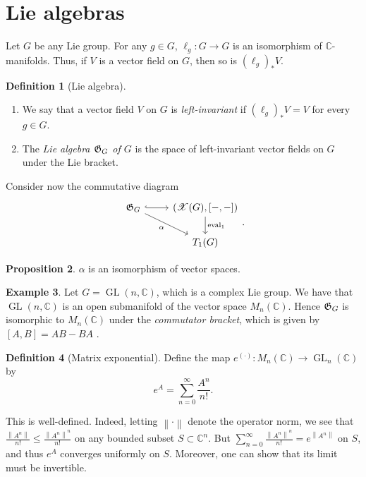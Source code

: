 \documentclass[10pt,letterpaper,cm]{nupset}
\theoremstyle{definition}
\newtheorem{defn}{Definition}[subsection]
\newtheorem{exmp}[defn]{Example}
\theoremstyle{theorem}
\newtheorem{prop}[defn]{Proposition}
\theoremstyle{remark}
\newcommand{\C}{\mathbb C}
\newcommand{\G}{\frak{G}}
\newcommand{\X}{\mathscr X}
\newcommand{\1}{\mathbb{1}}
\newcommand{\0}{\vec 0}
\DeclareMathOperator{\GL}{GL}
\DeclareMathOperator{\ev}{eval}
\newcommand{\be}{\begin{enumerate}}
\newcommand{\ee}{\end{enumerate}}
\begin{document}
\section{Lie algebras}

Let $G$ be any Lie group. For any $g\in G$, $\ell_g : G \to G$ is an isomorphism of $\C$-manifolds. Thus, if $V$ is a vector field on $G$, then so is $\left(\ell_g\right)_{\ast}{V}$.

\begin{defn}[Lie algebra] $ $
\be
\item We say that a vector field $V$ on $G$ is \textit{left-invariant} if $\left(\ell_g\right)_{\ast}{V} = V$ for every $g\in G$.
\item The \textit{Lie algebra $\G_G$ of $G$} is the space of left-invariant vector fields on $G$ under the Lie bracket.
\ee
\end{defn}

Consider now the commutative diagram
\[
\begin{tikzcd}
\G_G \arrow[r, hook] \arrow[rd, "\alpha"'] & {\left(\X(G), \left[{-},{-}\right]\right)} \arrow[d, "\ev_1"] \\
                                         & T_1(G)                                   
\end{tikzcd}.
\]

\begin{prop}
$\alpha$ is an isomorphism of vector spaces. 
\end{prop}


\begin{exmp}
Let $G = \GL(n, \C)$, which is a complex Lie group. We have that $\GL(n, \C)$ is an open submanifold of the vector space $M_n(\C)$. Hence $\G_G$ is  isomorphic to $M_n(\C)$ under the \textit{commutator bracket}, which is given by $\left[A,B\right]= AB -BA$ .
\end{exmp}

\begin{defn}[Matrix exponential]
Define the map $e^{\left(\cdot\right)} : M_n(\C) \to \GL_n(\C)$ by 
\[
e^A  = \sum_{n=0}^{\infty} \frac{A^n }{n!}.
\]
\end{defn}

This is well-defined. Indeed, letting $\left\lVert{\cdot}\right\rVert$ denote the operator norm, we see that $\frac{\left\lVert{A^n}\right\rVert}{n!}\leq \frac{\left\lVert{A^n}\right\rVert^n}{n!}$ on any bounded subset $S\subset \C^n$. But $\sum_{n=0}^{\infty}\frac{\left\lVert{A^n}\right\rVert^n}{n!} = e^{\left\lVert{A^n}\right\rVert}$ on $S$, and thus $e^A$ converges uniformly on $S$. Moreover, one can show that its limit must be invertible.
\end{document}

